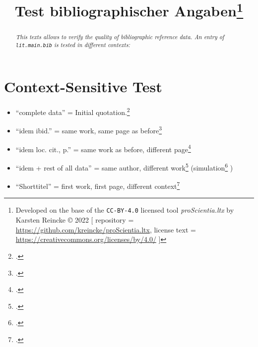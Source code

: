 \documentclass[
  DIV=calc,
  BCOR=5mm,
  11pt,
  headings=small,
  oneside,
  abstract=true,
  toc=bib,
  ngerman,english]{scrartcl}
\begin{document}
\nocite{*}

\titlehead{Bib\LaTeX}
\subject{Release 1.0}
\title{Test bibliographischer Angaben\footnote{
Developed on the base of the \texttt{CC-BY-4.0} licensed tool \textit{proScientia.ltx} by Karsten Reincke \copyright{} 2022 [
repository = \href{https://github.com/kreincke/proScientia.ltx}{https://github.com/kreincke/proScientia.ltx},
license text = \href{https://creativecommons.org/licenses/by/4.0/}{https://creativecommons.org/licenses/by/4.0/} ]}
}

\maketitle
\begin{abstract}
\noindent \itshape
This texts allows to verify the quality of bibliographic reference data. An entry of \texttt{lit.main.bib} is tested in different contexts:
\end{abstract}



\section{Context-Sensitive Test}
\begin{itemize}
  \item \enquote{complete data} = Initial quotation.\footcite[cf.][123]{KantKdrV1974}
  \item \enquote{idem ibid.} = same work, same page as before\footcite[cf.][123]{KantKdrV1974}
  \item \enquote{idem loc. cit., p.} = same work as before, different page\footcite[cf.][125f]{KantKdrV1974}
  \item \enquote{idem + rest of all data} = same author, different work\footcite[cf.][321]{KantKdpV1974} (simulation\footcite[cf.][42]{KantKdU1974} )
  \item \enquote{Shorttitel} = first work, first page, different context\footcite[cf.][123]{KantKdrV1974}
\end{itemize}



\printnomenclature
\printbibliography
\end{document}
